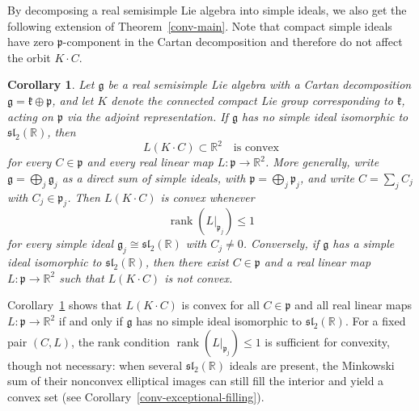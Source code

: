 \documentclass[11pt,reqno]{amsart}
\newtheorem{maincor}[mainthm]{Corollary}
\theoremstyle{remark}
\newcommand{\R}{\mathbb R}
\newcommand{\gfr}{\mathfrak g}
\newcommand{\kfr}{\mathfrak k}
\newcommand{\pfr}{\mathfrak p}
\begin{document}
By decomposing a real semisimple Lie algebra into simple ideals, we also
get the following extension of Theorem~\ref{conv-main}. Note that
compact simple ideals have zero $\pfr$-component in the Cartan
decomposition and therefore do not affect the orbit $K\cdot C$.

\begin{maincor}\label{conv-semisimple}
Let $\gfr$ be a real semisimple Lie algebra with a Cartan decomposition
$\gfr=\kfr\oplus\pfr$, and let $K$ denote the connected compact Lie
group corresponding to $\kfr$, acting on $\pfr$ via the adjoint
representation. If $\gfr$ has no simple ideal isomorphic to
$\mathfrak{sl}_2(\R)$, then
\[
 L(K\cdot C)\subset\R^2
 \quad\text{is convex}
\]
for every $C\in\pfr$ and every real linear map $L:\pfr\to\R^2$.
More generally, write $\gfr=\bigoplus_j\gfr_j$ as a direct sum of simple
ideals, with $\pfr=\bigoplus_j\pfr_j$, and write $C=\sum_j C_j$ with
$C_j\in\pfr_j$. Then $L(K\cdot C)$ is convex whenever
\[
 \operatorname{rank}(L|_{\pfr_j})\le1
\]
for every simple ideal $\gfr_j\cong\mathfrak{sl}_2(\R)$ with $C_j\ne0$.
Conversely, if $\gfr$ has a simple ideal isomorphic to
$\mathfrak{sl}_2(\R)$, then there exist $C\in\pfr$ and a real linear map
$L:\pfr\to\R^2$ such that $L(K\cdot C)$ is not convex.
\end{maincor}

Corollary~\ref{conv-semisimple} shows that $L(K\cdot C)$ is convex for
all $C\in\pfr$ and all real linear maps $L:\pfr\to\R^2$ if and only if
$\gfr$ has no simple ideal isomorphic to $\mathfrak{sl}_2(\R)$. For a
fixed pair $(C,L)$, the rank condition
$\operatorname{rank}(L|_{\pfr_j})\le1$ is sufficient for convexity,
though not necessary: when several $\mathfrak{sl}_2(\R)$ ideals are
present, the Minkowski sum of their nonconvex elliptical images can still
fill the interior and yield a convex set (see
Corollary~\ref{conv-exceptional-filling}).
\end{document}
